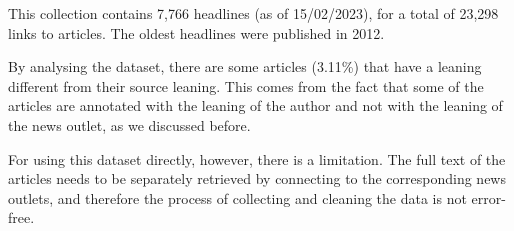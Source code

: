 

This collection contains 7,766 headlines (as of 15/02/2023), for a total of 23,298 links to articles.
The oldest headlines were published in 2012.

By analysing the dataset, there are some articles (3.11\%) %
that have a leaning different from their source leaning.
This comes from the fact that some of the articles are annotated with the leaning of the author and not with the leaning of the news outlet, as we discussed before.







For using this dataset directly, however, there is a limitation. The full text of the articles needs to be separately retrieved by connecting to the corresponding news outlets, and therefore the process of collecting and cleaning the data is not error-free.

